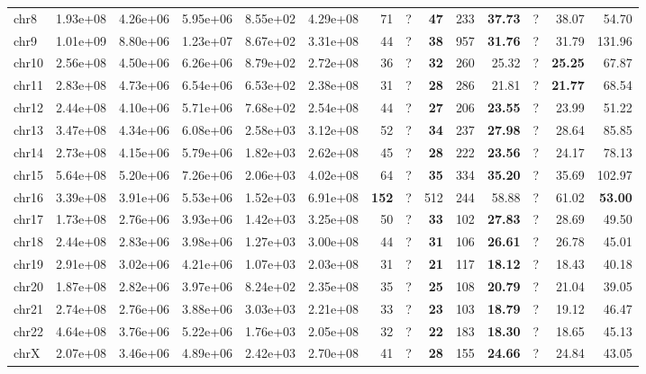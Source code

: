 \begin{table*}[!ht]
\begin{tabular}{@{}lrrrrrrrrrrrrr@{}}
		chr8 & 1.93e+08 & 4.26e+06 & 5.95e+06 & 8.55e+02 & 4.29e+08 & 71 & ? & \textbf{47} & 233 & \textbf{37.73} & ? & 38.07 & 54.70 \\ 
		chr9 & 1.01e+09 & 8.80e+06 & 1.23e+07 & 8.67e+02 & 3.31e+08 & 44 & ? & \textbf{38} & 957 & \textbf{31.76} & ? & 31.79 & 131.96 \\ 
		chr10 & 2.56e+08 & 4.50e+06 & 6.26e+06 & 8.79e+02 & 2.72e+08 & 36 & ? & \textbf{32} & 260 & 25.32 & ? & \textbf{25.25} & 67.87 \\ 
		chr11 & 2.83e+08 & 4.73e+06 & 6.54e+06 & 6.53e+02 & 2.38e+08 & 31 & ? & \textbf{28} & 286 & 21.81 & ? & \textbf{21.77} & 68.54 \\ 
		chr12 & 2.44e+08 & 4.10e+06 & 5.71e+06 & 7.68e+02 & 2.54e+08 & 44 & ? & \textbf{27} & 206 & \textbf{23.55} & ? & 23.99 & 51.22 \\ 
		chr13 & 3.47e+08 & 4.34e+06 & 6.08e+06 & 2.58e+03 & 3.12e+08 & 52 & ? & \textbf{34} & 237 & \textbf{27.98} & ? & 28.64 & 85.85 \\ 
		chr14 & 2.73e+08 & 4.15e+06 & 5.79e+06 & 1.82e+03 & 2.62e+08 & 45 & ? & \textbf{28} & 222 & \textbf{23.56} & ? & 24.17 & 78.13 \\ 
		chr15 & 5.64e+08 & 5.20e+06 & 7.26e+06 & 2.06e+03 & 4.02e+08 & 64 & ? & \textbf{35} & 334 & \textbf{35.20} & ? & 35.69 & 102.97 \\ 
		chr16 & 3.39e+08 & 3.91e+06 & 5.53e+06 & 1.52e+03 & 6.91e+08 & \textbf{152} & ? & 512 & 244 & 58.88 & ? & 61.02 & \textbf{53.00} \\ 
		chr17 & 1.73e+08 & 2.76e+06 & 3.93e+06 & 1.42e+03 & 3.25e+08 & 50 & ? & \textbf{33} & 102 & \textbf{27.83} & ? & 28.69 & 49.50 \\ 
		chr18 & 2.44e+08 & 2.83e+06 & 3.98e+06 & 1.27e+03 & 3.00e+08 & 44 & ? & \textbf{31} & 106 & \textbf{26.61} & ? & 26.78 & 45.01 \\ 
		chr19 & 2.91e+08 & 3.02e+06 & 4.21e+06 & 1.07e+03 & 2.03e+08 & 31 & ? & \textbf{21} & 117 & \textbf{18.12} & ? & 18.43 & 40.18 \\ 
		chr20 & 1.87e+08 & 2.82e+06 & 3.97e+06 & 8.24e+02 & 2.35e+08 & 35 & ? & \textbf{25} & 108 & \textbf{20.79} & ? & 21.04 & 39.05 \\ 
		chr21 & 2.74e+08 & 2.76e+06 & 3.88e+06 & 3.03e+03 & 2.21e+08 & 33 & ? & \textbf{23} & 103 & \textbf{18.79} & ? & 19.12 & 46.47 \\ 
		chr22 & 4.64e+08 & 3.76e+06 & 5.22e+06 & 1.76e+03 & 2.05e+08 & 32 & ? & \textbf{22} & 183 & \textbf{18.30} & ? & 18.65 & 45.13 \\ 
		chrX & 2.07e+08 & 3.46e+06 & 4.89e+06 & 2.42e+03 & 2.70e+08 & 41 & ? & \textbf{28} & 155 & \textbf{24.66} & ? & 24.84 & 43.05 \\ 

\end{tabular}
\end{table*}
